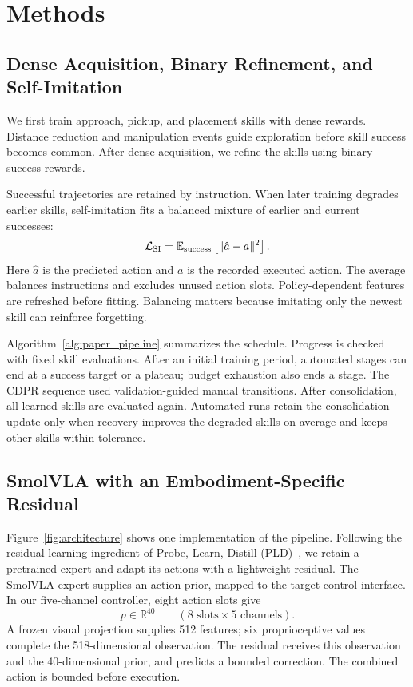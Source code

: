 \section{Methods}\label{sec:method}


\subsection{Dense Acquisition, Binary Refinement, and Self-Imitation}
We first train approach, pickup, and placement skills with dense rewards. Distance reduction and manipulation events guide exploration before skill success becomes common. After dense acquisition, we refine the skills using binary success rewards.

Successful trajectories are retained by instruction. When later training degrades earlier skills, self-imitation fits a balanced mixture of earlier and current successes:
\begin{equation}
\mathcal L_{\rm SI}=\mathbb E_{\rm success}
\left[\|\hat a-a\|^2\right].
\label{eq:si_loss}
\end{equation}
Here $\hat a$ is the predicted action and $a$ is the recorded executed action. The average balances instructions and excludes unused action slots. Policy-dependent features are refreshed before fitting. Balancing matters because imitating only the newest skill can reinforce forgetting.

Algorithm~\ref{alg:paper_pipeline} summarizes the schedule. Progress is checked with fixed skill evaluations. After an initial training period, automated stages can end at a success target or a plateau; budget exhaustion also ends a stage. The CDPR sequence used validation-guided manual transitions. After consolidation, all learned skills are evaluated again. Automated runs retain the consolidation update only when recovery improves the degraded skills on average and keeps other skills within tolerance.


\subsection{SmolVLA with an Embodiment-Specific Residual}
Figure~\ref{fig:architecture} shows one implementation of the pipeline. Following the residual-learning ingredient of Probe, Learn, Distill (PLD)~\cite{pld}, we retain a pretrained expert and adapt its actions with a lightweight residual. The SmolVLA expert supplies an action prior, mapped to the target control interface. In our five-channel controller, eight action slots give
\begin{equation}
p\in\mathbb R^{40}
\qquad
(8\text{ slots}\times5\text{ channels}).
\label{eq:prior}
\end{equation}
A frozen visual projection supplies 512 features; six proprioceptive values complete the 518-dimensional observation. The residual receives this observation and the 40-dimensional prior, and predicts a bounded correction. The combined action is bounded before execution.

